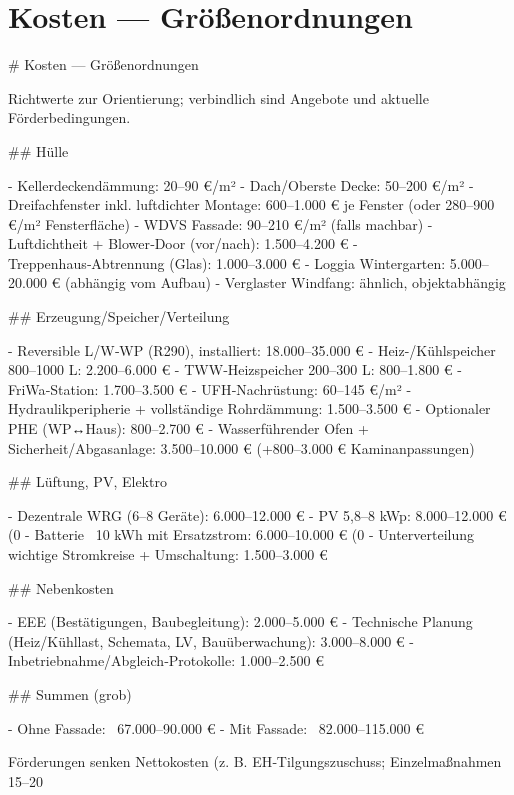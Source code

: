 \documentclass[11pt,oneside]{report}
\begin{document}
\chapter{Kosten — Größenordnungen}
\begin{markdown}
# Kosten — Größenordnungen

Richtwerte zur Orientierung; verbindlich sind Angebote und aktuelle Förderbedingungen.

## Hülle

- Kellerdeckendämmung: 20–90 €/m²
- Dach/Oberste Decke: 50–200 €/m²
- Dreifachfenster inkl. luftdichter Montage: 600–1.000 € je Fenster (oder 280–900 €/m² Fensterfläche)
- WDVS Fassade: 90–210 €/m² (falls machbar)
- Luftdichtheit + Blower‑Door (vor/nach): 1.500–4.200 €
- Treppenhaus‑Abtrennung (Glas): 1.000–3.000 €
- Loggia Wintergarten: 5.000–20.000 € (abhängig vom Aufbau)
- Verglaster Windfang: ähnlich, objektabhängig

## Erzeugung/Speicher/Verteilung

- Reversible L/W‑WP (R290), installiert: 18.000–35.000 €
- Heiz-/Kühlspeicher 800–1000 L: 2.200–6.000 €
- TWW‑Heizspeicher 200–300 L: 800–1.800 €
- FriWa‑Station: 1.700–3.500 €
- UFH‑Nachrüstung: 60–145 €/m²
- Hydraulikperipherie + vollständige Rohrdämmung: 1.500–3.500 €
- Optionaler PHE (WP↔Haus): 800–2.700 €
- Wasserführender Ofen + Sicherheit/Abgasanlage: 3.500–10.000 € (+800–3.000 € Kaminanpassungen)

## Lüftung, PV, Elektro

- Dezentrale WRG (6–8 Geräte): 6.000–12.000 €
- PV 5,8–8 kWp: 8.000–12.000 € (0 %
- Batterie ~10 kWh mit Ersatzstrom: 6.000–10.000 € (0 %
- Unterverteilung wichtige Stromkreise + Umschaltung: 1.500–3.000 €

## Nebenkosten

- EEE (Bestätigungen, Baubegleitung): 2.000–5.000 €
- Technische Planung (Heiz/Kühllast, Schemata, LV, Bauüberwachung): 3.000–8.000 €
- Inbetriebnahme/Abgleich‑Protokolle: 1.000–2.500 €

## Summen (grob)

- Ohne Fassade: ~67.000–90.000 €
- Mit Fassade: ~82.000–115.000 €

Förderungen senken Nettokosten (z. B. EH‑Tilgungszuschuss; Einzelmaßnahmen 15–20 %
\end{markdown}
\end{document}
